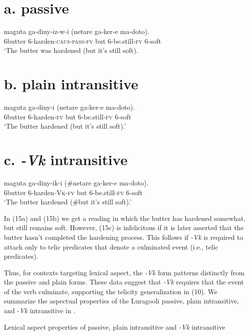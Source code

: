 \documentclass[output=paper]{langsci/langscibook}
\begin{document}
\begin{styleTabellenberschrift}
\chapter[a. passive]{a.\textbf{ passive}}
\gll maguta  ga-diny-iz-w-i                     (netare ga-ker-e       ma-doto).\\
     6butter  6-harden-\textsc{caus}{}-\textsc{pass}{}-\textsc{fv}       but      6-be.still-\textsc{fv} 6-soft\\
\glt ‘The butter was hardened (but it’s still soft).
\z

\chapter[b. plain intransitive]{b. \textbf{plain intransitive}}
\gll maguta ga-diny-i      (netare ga-ker-e       ma-doto).\\
     6butter 6-harden-\textsc{fv}   but     6-be.still-\textsc{fv}  6-soft\\
\glt ‘The butter hardened (but it’s still soft).’
\z

\chapter[c. {}-Vk intransitive]{c. \textbf{\textit{{}-Vk}}\textbf{ intransitive}}
\gll maguta ga-diny-ik-i        (\#netare ga-ker-e       ma-doto).\\
     6butter 6-harden\textit{{}-}\textsc{Vk}{}-\textsc{fv}     but      6-be.still-\textsc{fv} 6-soft\\
\glt ‘The butter hardened (\#but it’s still soft).’
\z

In (15a) and (15b) we get a reading in which the butter has hardened somewhat, but still remains soft. However, (15c) is infelicitous if it is later asserted that the butter hasn’t completed the hardening process. This follows if \textit{{}-Vk} is required to attach only to telic predicates that denote a culminated event (i.e., telic predicates).

Thus, for contexts targeting lexical aspect, the \textit{{}-Vk} form patterns distinctly from the passive and plain forms. These data suggest that \textit{{}-Vk} requires that the event of the verb culminate, supporting the telicity generalization in (10). We summarize the aspectual properties of the Luragooli passive, plain intransitive, and -\textit{Vk} intransitive in . 

\begin{styleTabellenberschrift}%
\begin{table}
\caption{Lexical aspect properties of passive, plain intransitive and \textit{{}-Vk} intransitive}
\label{tab:3}
\end{table}\end{styleTabellenberschrift}


\end{styleTabellenberschrift}
\end{document}

